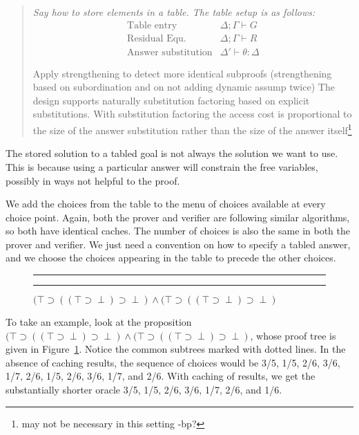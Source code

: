 \documentclass{acmconf}
\newcommand{\figfoot}{\vspace{1ex}\hrule}
\newcommand{\fighead}{\hrule\vspace{1.5ex}}
\newcommand{\andl}{\wedge}
\newcommand{\impl}{\supset}
\newcommand{\vd}{\vdash}
\newenvironment{note}{\begin{quote}\message{note!}\it}{\end{quote}}
\begin{document}
\begin{note}
  Say how to store elements in a table.
The table setup is as follows:
\[
\begin{array}{ll}
\mbox{Table entry} & \Delta ; \Gamma \vd G\\
\mbox{Residual Equ.} & \Delta ; \Gamma \vd R \\
\mbox{Answer substitution} & \Delta' \vd \theta : \Delta
\end{array}
\]

Apply strengthening to detect more identical subproofs (strengthening
based on subordination and on not adding dynamic assump twice)
The design supports naturally substitution factoring based on explicit
substitutions\cite{RamakrishnanJLP99}. With substitution factoring the
access cost is proportional to the size of the answer substitution
rather than the size of the answer itself\footnote{may not be necessary in
this setting -bp?}
\end{note}

The stored solution to a tabled goal is not always the solution we
want to use.  This is because using a particular answer will constrain
the free variables, possibly in ways not helpful to the proof. 

We add the choices from the table to the menu of choices available at
every choice point. Again, both the prover and verifier are following
similar algorithms, so both have identical caches. The number of
choices is also the same in both the prover and verifier. We just need
a convention on how to specify a tabled answer, and we choose the
choices appearing in the table to precede the other choices.

\begin{figure}
\fighead
\hspace{-0.5in}
\vspace{1.5in}
\caption{\label{prooftree3}
$(\top\impl((\top\impl\perp)\impl\perp) \andl
(\top\impl((\top\impl\perp)\impl\perp)$}
\figfoot
\end{figure}

To take an example, look at the proposition
$(\top\impl((\top\impl\perp)\impl\perp) \andl
(\top\impl((\top\impl\perp)\impl\perp)$, whose proof tree is
given in Figure~\ref{prooftree3}. Notice the common subtrees marked
with dotted lines.  In the absence of caching results, the sequence of
choices would be 3/5, 1/5, 2/6, 3/6, 1/7, 2/6, 1/5, 2/6, 3/6, 1/7, and
2/6. With caching of results, we get the substantially shorter oracle
3/5, 1/5, 2/6, 3/6, 1/7, 2/6, and 1/6.
\end{document}
